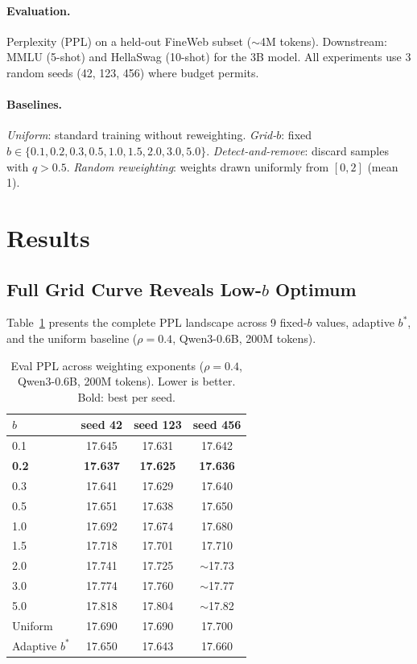 \documentclass[11pt]{article}
\begin{document}
\paragraph{Evaluation.}
Perplexity (PPL) on a held-out FineWeb subset ($\sim$4M tokens).
Downstream: MMLU (5-shot) and HellaSwag (10-shot) for the 3B model.
All experiments use 3 random seeds (42, 123, 456) where budget permits.

\paragraph{Baselines.}
\textit{Uniform}: standard training without reweighting.
\textit{Grid-$b$}: fixed $b \in \{0.1, 0.2, 0.3, 0.5, 1.0, 1.5, 2.0, 3.0, 5.0\}$.
\textit{Detect-and-remove}: discard samples with $q > 0.5$.
\textit{Random reweighting}: weights drawn uniformly from $[0, 2]$ (mean 1).

\section{Results}
\label{sec:results}

\subsection{Full Grid Curve Reveals Low-$b$ Optimum}
\label{sec:grid_curve}

Table~\ref{tab:full_grid} presents the complete PPL landscape across 9 fixed-$b$ values, adaptive $b^*$, and the uniform baseline ($\rho = 0.4$, Qwen3-0.6B, 200M tokens).

\begin{table}[t]
\centering
\caption{Eval PPL across weighting exponents ($\rho = 0.4$, Qwen3-0.6B, 200M tokens). Lower is better. Bold: best per seed.}
\label{tab:full_grid}
\small
\begin{tabular}{lccc}
\toprule
$b$ & seed 42 & seed 123 & seed 456 \\
\midrule
0.1     & 17.645 & 17.631 & 17.642 \\
\textbf{0.2}     & \textbf{17.637} & \textbf{17.625} & \textbf{17.636} \\
0.3     & 17.641 & 17.629 & 17.640 \\
0.5     & 17.651 & 17.638 & 17.650 \\
1.0     & 17.692 & 17.674 & 17.680 \\
1.5     & 17.718 & 17.701 & 17.710 \\
2.0     & 17.741 & 17.725 & $\sim$17.73 \\
3.0     & 17.774 & 17.760 & $\sim$17.77 \\
5.0     & 17.818 & 17.804 & $\sim$17.82 \\
\midrule
Uniform & 17.690 & 17.690 & 17.700 \\
Adaptive $b^*$ & 17.650 & 17.643 & 17.660 \\
\bottomrule
\end{tabular}
\end{table}
\end{document}

